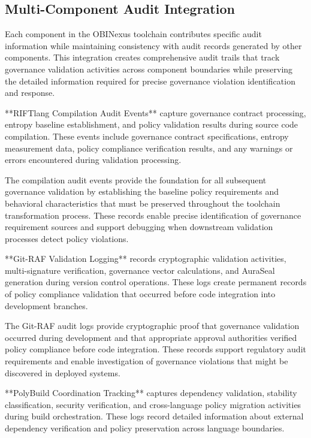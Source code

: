 \subsection{Multi-Component Audit Integration}

Each component in the OBINexus toolchain contributes specific audit information while maintaining consistency with audit records generated by other components. This integration creates comprehensive audit trails that track governance validation activities across component boundaries while preserving the detailed information required for precise governance violation identification and response.

**RIFTlang Compilation Audit Events** capture governance contract processing, entropy baseline establishment, and policy validation results during source code compilation. These events include governance contract specifications, entropy measurement data, policy compliance verification results, and any warnings or errors encountered during validation processing.

The compilation audit events provide the foundation for all subsequent governance validation by establishing the baseline policy requirements and behavioral characteristics that must be preserved throughout the toolchain transformation process. These records enable precise identification of governance requirement sources and support debugging when downstream validation processes detect policy violations.

**Git-RAF Validation Logging** records cryptographic validation activities, multi-signature verification, governance vector calculations, and AuraSeal generation during version control operations. These logs create permanent records of policy compliance validation that occurred before code integration into development branches.

The Git-RAF audit logs provide cryptographic proof that governance validation occurred during development and that appropriate approval authorities verified policy compliance before code integration. These records support regulatory audit requirements and enable investigation of governance violations that might be discovered in deployed systems.

**PolyBuild Coordination Tracking** captures dependency validation, stability classification, security verification, and cross-language policy migration activities during build orchestration. These logs record detailed information about external dependency verification and policy preservation across language boundaries.

